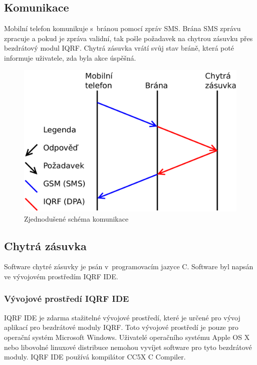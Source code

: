 \documentclass[12pt,a4paper,oneside]{article}
\begin{document}
\subsection{Komunikace}

Mobilní telefon komunikuje s~bránou pomocí zpráv SMS. Brána SMS zprávu zpracuje a pokud je zpráva validní, tak pošle požadavek na chytrou zásuvku přes bezdrátový modul IQRF. Chytrá zásuvka vrátí svůj stav bráně, která poté informuje uživatele, zda byla akce úspěšná.

\begin{figure}[H]
\centering
\label{fig:iqrf/zjednodusene-schema}
\includegraphics[width = 128mm]{img/blokove-schema/komunikace0.pdf}
\caption{Zjednodušené schéma komunikace}
\end{figure}

\newpage

\subsection{Chytrá zásuvka}

Software chytré zásuvky je psán v~programovacím jazyce C. Software byl napsán ve vývojovém prostředím IQRF IDE\cite{iqrf/ide}.

\subsubsection{Vývojové prostředí IQRF IDE}

IQRF IDE\cite{iqrf/ide} je zdarma stažitelné vývojové prostředí, které je určené pro vývoj aplikací pro bezdrátové moduly IQRF. Toto vývojové prostředí je pouze pro operační systém Microsoft Windows. Uživatelé operačního systému Apple OS X nebo libovolné linuxové distribuce nemohou vyvíjet software pro tyto bezdrátové moduly. IQRF IDE používá kompilátor CC5X C Compiler\cite{cc5x-compiler}.
\end{document}
